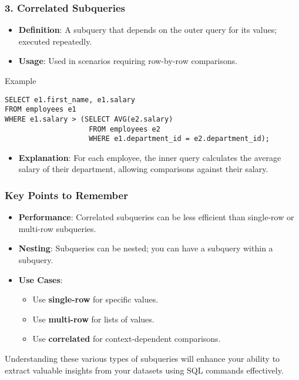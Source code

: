 \documentclass[aspectratio=169]{beamer}
\begin{document}
\begin{frame}[fragile]
    \frametitle{3. Correlated Subqueries}
    \begin{itemize}
        \item \textbf{Definition}: A subquery that depends on the outer query for its values; executed repeatedly.
        \item \textbf{Usage}: Used in scenarios requiring row-by-row comparisons.
    \end{itemize}
    \begin{block}{Example}
        \begin{lstlisting}
SELECT e1.first_name, e1.salary
FROM employees e1
WHERE e1.salary > (SELECT AVG(e2.salary) 
                    FROM employees e2 
                    WHERE e1.department_id = e2.department_id);
        \end{lstlisting}
    \end{block}
    \begin{itemize}
        \item \textbf{Explanation}: For each employee, the inner query calculates the average salary of their department,
        allowing comparisons against their salary.
    \end{itemize}
\end{frame}

\begin{frame}
    \frametitle{Key Points to Remember}
    \begin{itemize}
        \item \textbf{Performance}: Correlated subqueries can be less efficient than single-row or multi-row subqueries.
        \item \textbf{Nesting}: Subqueries can be nested; you can have a subquery within a subquery.
        \item \textbf{Use Cases}:
        \begin{itemize}
            \item Use \textbf{single-row} for specific values.
            \item Use \textbf{multi-row} for lists of values.
            \item Use \textbf{correlated} for context-dependent comparisons.
        \end{itemize}
    \end{itemize}
    Understanding these various types of subqueries will enhance your ability to extract valuable insights from your datasets using SQL commands effectively.
\end{frame}
\end{document}
